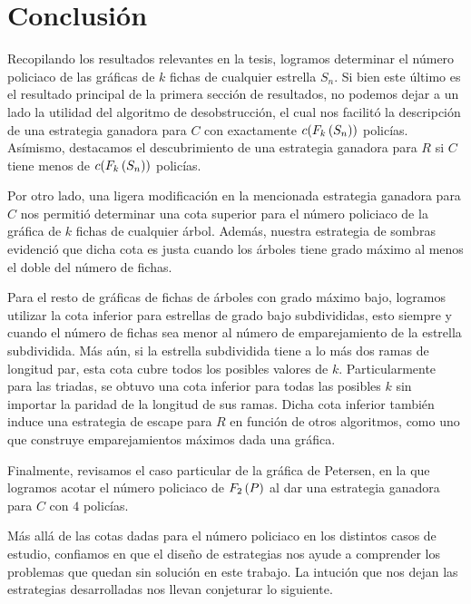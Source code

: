 \chapter{Conclusi\'on}
\label{cap:conc}

Recopilando los resultados relevantes en la tesis, logramos determinar el
n\'umero policiaco de las gr\'aficas de $k$ fichas de cualquier estrella $S_n$.
Si bien este \'ultimo es el resultado principal de la primera secci\'on de
resultados, no podemos dejar a un lado la utilidad del algoritmo de
desobstrucci\'on, el cual nos facilit\'o la descripci\'on de una estrategia
ganadora para $C$ con exactamente $c(F_{k}\left( S_n\right))$ polic\'ias. As\'imismo,
destacamos el descubrimiento de una estrategia ganadora para $R$ si $C$ tiene
menos de $c(F_{k}\left( S_n\right))$ polic\'ias.

Por otro lado, una ligera modificaci\'on en la mencionada estrategia ganadora
para $C$ nos permiti\'o determinar una cota superior para el n\'umero policiaco
de la gr\'afica de $k$ fichas de cualquier \'arbol. Adem\'as, nuestra estrategia
de sombras evidenci\'o que dicha cota es justa cuando los \'arboles tiene grado
m\'aximo al menos el doble del n\'umero de fichas.

Para el resto de gr\'aficas de fichas de \'arboles con grado m\'aximo bajo,
logramos utilizar la cota inferior para estrellas de grado bajo subdivididas,
esto siempre y cuando el n\'umero de fichas sea menor al n\'umero de
emparejamiento de la estrella subdividida. M\'as a\'un, si la estrella
subdividida tiene a lo m\'as dos ramas de longitud par, esta cota cubre todos
los posibles valores de $k$. Particularmente para las triadas, se obtuvo una
cota inferior para todas las posibles $k$ sin importar la paridad de la longitud
de sus ramas. Dicha cota inferior tambi\'en induce una estrategia de escape para
$R$ en funci\'on de otros algoritmos, como uno que construye emparejamientos
m\'aximos dada una gr\'afica.

Finalmente, revisamos el caso particular de la gr\'afica de Petersen, en la que
logramos acotar el n\'umero policiaco de $F_{2}\left( P\right)$ al dar una estrategia
ganadora para $C$ con $4$ polic\'ias.

M\'as all\'a de las cotas dadas para el n\'umero policiaco en los distintos
casos de estudio, confiamos en que el dise\~no de estrategias nos ayude a
comprender los problemas que quedan sin soluci\'on en este trabajo. La
intuci\'on que nos dejan las estrategias desarrolladas nos llevan conjeturar lo
siguiente.

